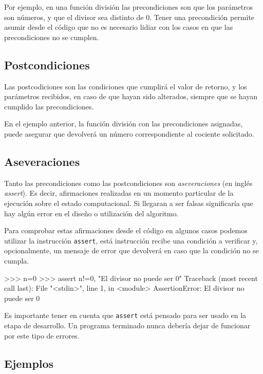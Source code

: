 Por ejemplo, en una función división las precondiciones son que los parámetros
son números, y que el divisor sea distinto de 0. Tener una precondición
permite asumir desde el código que no es necesario lidiar con los casos en que
las precondiciones no se cumplen.

\subsection{Postcondiciones}

Las postcodiciones son las condiciones que cumplirá el valor de retorno, y
los parámetros recibidos, en caso de que hayan sido alterados,
siempre que se hayan cumplido las precondiciones.

En el ejemplo anterior, la función división con las precondiciones asignadas,
puede asegurar que devolverá un número correspondiente al cociente solicitado.

\subsection{Aseveraciones}

Tanto las precondiciones como las postcondiciones son \textit{aseveraciones}
(en inglés \textit{assert}). Es decir, afirmaciones realizadas en un momento
particular de la ejecución sobre el estado computacional. Si llegaran a ser
falsas significaría que hay algún error en el diseño o utilización del algoritmo.

Para comprobar estas afirmaciones desde el código en algunos casos podemos
utilizar la instrucción \lstinline!assert!, está instrucción recibe una
condición a verificar y, opcionalmente, un mensaje de error que devolverá en
caso que la condición no se cumpla.

\begin{codigo-python-sn}
>>> n=0
>>> assert n!=0, "El divisor no puede ser 0"
Traceback (most recent call last):
  File "<stdin>", line 1, in <module>
AssertionError: El divisor no puede ser 0
\end{codigo-python-sn}

\begin{atencion}
Es importante tener en cuenta que \lstinline!assert! está pensado para ser
usado en la etapa de desarrollo. Un programa terminado nunca debería dejar
de funcionar por este tipo de errores.
\end{atencion}

\subsection{Ejemplos}

